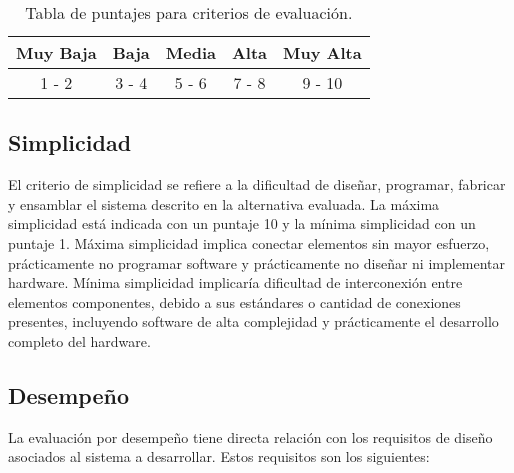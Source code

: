 \begin{table}[H]
	\centering
	\begin{tabular}{lllll}
		\hline
		\multicolumn{1}{|c|}{\textbf{Muy Baja}} & \multicolumn{1}{c|}{\textbf{Baja}} & \multicolumn{1}{c|}{\textbf{Media}} & \multicolumn{1}{c|}{\textbf{Alta}} & \multicolumn{1}{c|}{\textbf{Muy Alta}} \\ \hline
		\multicolumn{1}{|c|}{1 - 2}                 & \multicolumn{1}{c|}{3 - 4}             & \multicolumn{1}{c|}{5 - 6}           & \multicolumn{1}{c|}{7 - 8}           & \multicolumn{1}{c|}{9 - 10}              \\ \hline 
	\end{tabular}
	\caption{Tabla de puntajes para criterios de evaluación.}
	\label{tab:escala}
\end{table}

\subsection*{Simplicidad}
\par El criterio de simplicidad se refiere a la dificultad de diseñar, programar, fabricar y ensamblar el sistema descrito en la alternativa evaluada. La máxima simplicidad está indicada con un puntaje 10 y la mínima simplicidad con un puntaje 1. Máxima simplicidad implica conectar elementos sin mayor esfuerzo, prácticamente no programar software y prácticamente no diseñar ni implementar hardware. Mínima simplicidad implicaría dificultad de interconexión entre elementos componentes, debido a sus estándares o cantidad de conexiones presentes, incluyendo software de alta complejidad y prácticamente el desarrollo completo del hardware.

\subsection*{Desempeño}
La evaluación por desempeño tiene directa relación con los requisitos de diseño asociados al sistema a desarrollar. Estos requisitos son los siguientes:

